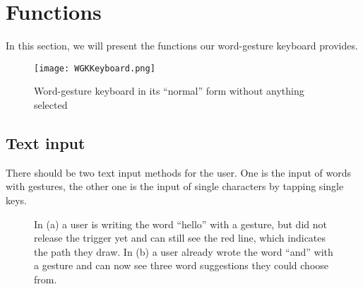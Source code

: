 \section{Functions}
In this section, we will present the functions our word-gesture keyboard provides.
\begin{figure}
\centering
\texttt{[image: WGKKeyboard.png]}
\caption{Word-gesture keyboard in its ``normal'' form without anything selected}
\end{figure}
    
\subsection{Text input}
There should be two text input methods for the user. One is the input of words with gestures, the other one is the input of single characters by tapping single keys.

\begin{figure}[H]
    \caption{In (a) a user is writing the word ``hello'' with a gesture, but did not release the trigger yet and can still see the red line, which indicates the path they draw. In (b) a user already wrote the word ``and'' with a gesture and can now see three word suggestions they could choose from.}
    \label{fig:write_suggestions}
\end{figure}

